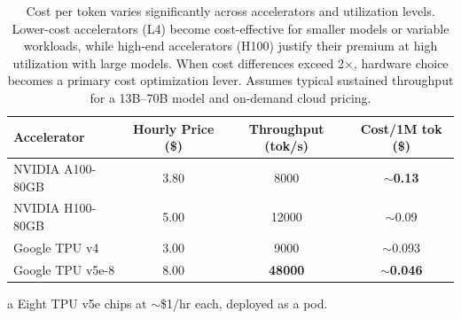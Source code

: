 \begin{table}[t]
  \centering
  \small
  \caption{Cost per token varies significantly across accelerators and utilization levels. Lower-cost accelerators (L4) become cost-effective for smaller models or variable workloads, while high-end accelerators (H100) justify their premium at high utilization with large models. When cost differences exceed 2$\times$, hardware choice becomes a primary cost optimization lever. Assumes typical sustained throughput for a 13B--70B model and on-demand cloud pricing.}
  \label{tab:ch03_costcompare}
  \setlength{\tabcolsep}{6pt}
  \renewcommand{\arraystretch}{1.3}
  \begin{threeparttable}
  \begin{tabularx}{\linewidth}{@{}X S[table-format=1.2] S[table-format=5.0] S[table-format=1.3]@{}}
    \toprule
    \textbf{Accelerator} & {\textbf{Hourly Price (\$)}} & {\textbf{Throughput (tok/s)}} & {\textbf{Cost/1M tok (\$)}} \\
    \midrule
    NVIDIA A100-80GB & 3.80 & 8000 & {\textcolor{orange!70!black}{\textbf{$\sim$0.13}}} \\
    NVIDIA H100-80GB & 5.00 & 12000 & {$\sim$0.09} \\
    \addlinespace[2pt]
    Google TPU v4     & 3.00 & 9000  & {$\sim$0.093} \\
    Google TPU v5e-8  & {8.00} & \textcolor{green!70!black}{\textbf{48000}} & {\textcolor{green!70!black}{\textbf{$\sim$0.046}}} \\
    \bottomrule
  \end{tabularx}
  \begin{tablenotes}
  \footnotesize
  \item[a] Eight TPU v5e chips at $\sim$\$1/hr each, deployed as a pod.
  \end{tablenotes}
  \end{threeparttable}
\end{table}


